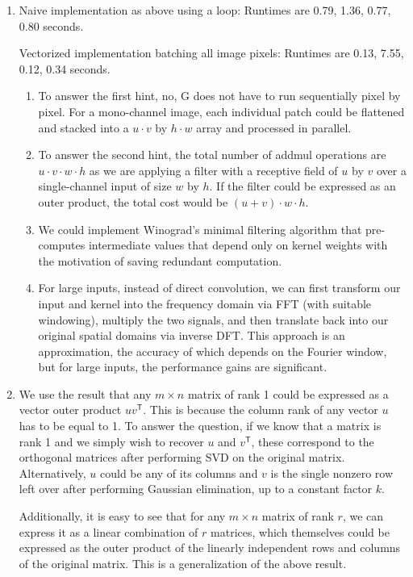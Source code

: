 \documentclass{article}
\begin{document}
\begin{enumerate}[label=(\roman*)]
\item %
Naive implementation as above using a loop: Runtimes are 0.79, 1.36, 0.77, 0.80 seconds.

Vectorized implementation batching all image pixels: Runtimes are 0.13, 7.55, 0.12, 0.34 seconds.

\begin{enumerate}
\item To answer the first hint, no, G does not have to run sequentially pixel by pixel. For a mono-channel image, each individual patch could be flattened and stacked into a $u\cdot v$ by $h\cdot w$ array and processed in parallel.

\item To answer the second hint, the total number of addmul operations are $u \cdot v \cdot w \cdot h$ as we are applying a filter with a receptive field of $u$ by $v$ over a single-channel input of size $w$ by $h$. If the filter could be expressed as an outer product, the total cost would be $(u+v) \cdot w \cdot h$.

\item We could implement Winograd's minimal filtering algorithm that pre-computes intermediate values that depend only on kernel weights with the motivation of saving redundant computation.

\item For large inputs, instead of direct convolution, we can first transform our input and kernel into the frequency domain via FFT (with suitable windowing), multiply the two signals, and then translate back into our original spatial domains via inverse DFT. This approach is an approximation, the accuracy of which depends on the Fourier window, but for large inputs, the performance gains are significant.
\end{enumerate}

\item %
We use the result that any $m\times n$ matrix of rank 1 could be expressed as a vector outer product $uv^\mathsf{T}$. This is because the column rank of any vector $u$ has to be equal to 1. To answer the question, if we know that a matrix is rank 1 and we simply wish to recover $u$ and $v^\mathsf{T}$, these correspond to the orthogonal matrices after performing SVD on the original matrix. Alternatively, $u$ could be any of its columns and $v$ is the single nonzero row left over after performing Gaussian elimination, up to a constant factor $k$.

Additionally, it is easy to see that for any $m\times n$ matrix of rank $r$, we can express it as a linear combination of $r$ matrices, which themselves could be expressed as the outer product of the linearly independent rows and columns of the original matrix. This is a generalization of the above result.


\end{enumerate}
\end{document}
